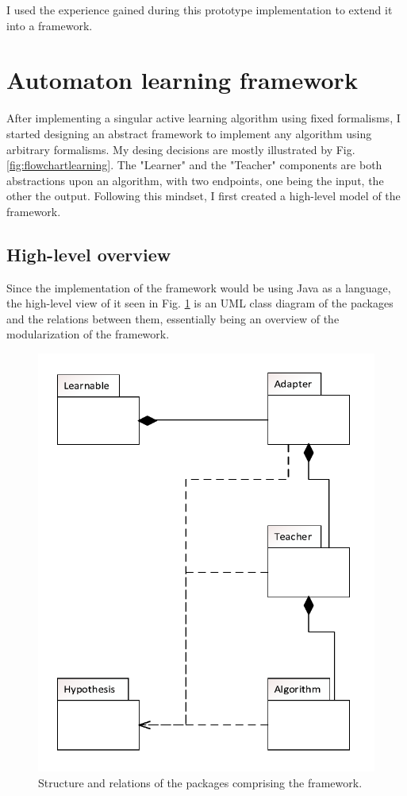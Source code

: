 I used the experience gained during this prototype implementation to extend it into a framework.

\section{Automaton learning framework}
After implementing a singular active learning algorithm using fixed formalisms, I started designing an abstract framework to implement any algorithm using arbitrary formalisms. My desing decisions are mostly illustrated by Fig. \ref{fig:flowchartlearning}. The "Learner" and the "Teacher" components are both abstractions upon an algorithm, with two endpoints, one being the input, the other the output. Following this mindset, I first created a high-level model of the framework.

\subsection{High-level overview}

Since the implementation of the framework would be using Java as a language, the high-level view of it seen in Fig. \ref{fig:abstractoverview} is an UML class diagram of the packages and the relations between them, essentially being an overview of the modularization of the framework.

\begin{figure}
	\centering
	\includegraphics[width=0.5\linewidth]{figures/abstractoverview}
	\caption{Structure and relations of the packages comprising the framework.}
	\label{fig:abstractoverview}
\end{figure}

